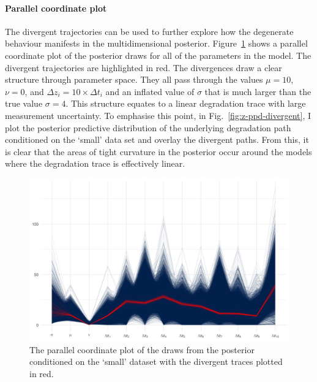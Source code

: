 \paragraph*{Parallel coordinate plot}
The divergent trajectories can be used to further explore how the degenerate behaviour manifests in the multidimensional posterior. Figure~\ref{fig:par-coord-single} shows a parallel coordinate plot of the posterior draws for all of the parameters in the model. The divergent trajectories are highlighted in red. The divergences draw a clear structure through parameter space. They all pass through the values $\mu = 10$, $\nu = 0$, and $\Delta z_i = 10 \times \Delta t_i$ and an inflated value of $\sigma$ that is much larger than the true value $\sigma = 4$. This structure equates to a linear degradation trace with large measurement uncertainty. To emphasise this point, in Fig.~\ref{fig:z-ppd-divergent}, I plot the posterior predictive distribution of the underlying degradation path conditioned on the `small' data set and overlay the divergent paths. From this, it is clear that the areas of tight curvature in the posterior occur around the models where the degradation trace is effectively linear.

\begin{figure}[tbp]
  \centering
  \includegraphics[width=0.95\columnwidth]{./figures/ch-4/parcoord.png}
  \caption{The parallel coordinate plot of the draws from the posterior conditioned on the `small' dataset with the divergent traces plotted in red.}
  \label{fig:par-coord-single}
\end{figure}

